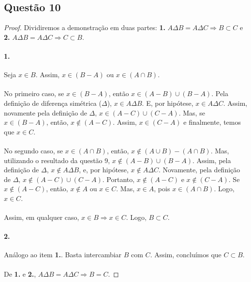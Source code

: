 \documentclass[11pt,a4paper]{report}
\begin{document}
    \subsection{Questão 10}
    \begin{proof}
    Dividiremos a demonstração em duas partes: \textbf{1.} $A \Delta B = A \Delta C \Rightarrow B \subset C$ e \textbf{2.} $A \Delta B = A\Delta C \Rightarrow C \subset B$.

    \paragraph{1.}
    Seja $x \in B$. Assim, $x \in (B - A)$ ou $x \in (A \cap B)$.

    \paragraph{}
    No primeiro caso, se $x \in (B - A)$, então $x \in (A - B) \cup (B - A)$. Pela definição de diferença simétrica ($\Delta$), $x \in A \Delta B$. E, por hipótese, $x \in A \Delta C$. Assim, novamente pela definição de $\Delta$, $x \in (A - C) \cup (C - A)$. Mas, se $x \in (B - A)$, então, $x \not\in (A - C)$. Assim, $x \in (C - A)$ e finalmente, temos que $x \in C$.

    \paragraph{}
    No segundo caso, se $x \in (A \cap B)$, então, $x \not\in (A \cup B) - (A \cap B)$. Mas, utilizando o resultado da questão 9, $x \not\in (A - B) \cup (B - A)$. Assim, pela definição de $\Delta$, $x \not\in A \Delta B$, e, por hipótese, $x \not\in A \Delta C$. Novamente, pela definição de $\Delta$, $x \not\in (A - C) \cup (C - A)$. Portanto, $x \not\in (A - C)$ e $x \not\in (C - A)$. Se $x \not\in (A - C)$, então, $x \not\in A$ ou $x \in C$. Mas, $x \in A$, pois $x \in (A \cap B)$. Logo, $x \in C$.

    \paragraph{}
    Assim, em qualquer caso, $x \in B \Rightarrow x \in C$. Logo, $B \subset C$.

    \paragraph{2.}
    Análogo ao item \textbf{1.}. Basta intercambiar $B$ com $C$. Assim, concluímos que $C \subset B$.

    \paragraph{}
    De \textbf{1.} e \textbf{2.}, $A \Delta B = A \Delta C \Rightarrow B = C$.
    \end{proof}
\end{document}
